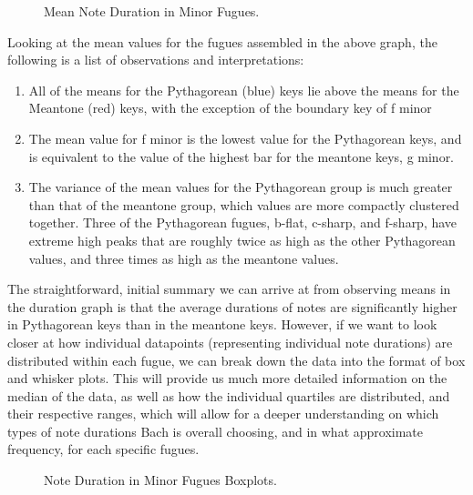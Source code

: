 \begin{figure}[H]
\vspace{1.5em}
    \centering
    \caption{Mean Note Duration in Minor Fugues.}
\end{figure}    Looking at the mean values for the fugues assembled in the above graph,
the following is a list of observations and interpretations:

\begin{enumerate}
\def\labelenumi{\arabic{enumi}.}
\tightlist
\item
  All of the means for the Pythagorean (blue) keys lie above the means
  for the Meantone (red) keys, with the exception of the boundary key of
  f minor
\item
  The mean value for f minor is the lowest value for the Pythagorean
  keys, and is equivalent to the value of the highest bar for the
  meantone keys, g minor.
\item
  The variance of the mean values for the Pythagorean group is much
  greater than that of the meantone group, which values are more
  compactly clustered together. Three of the Pythagorean fugues, b-flat,
  c-sharp, and f-sharp, have extreme high peaks that are roughly twice
  as high as the other Pythagorean values, and three times as high as
  the meantone values.
\end{enumerate}

The straightforward, initial summary we can arrive at from observing
means in the duration graph is that the average durations of notes are
significantly higher in Pythagorean keys than in the meantone keys.
However, if we want to look closer at how individual datapoints
(representing individual note durations) are distributed within each
fugue, we can break down the data into the format of box and whisker
plots. This will provide us much more detailed information on the median
of the data, as well as how the individual quartiles are distributed,
and their respective ranges, which will allow for a deeper understanding
on which types of note durations Bach is overall choosing, and in what
approximate frequency, for each specific fugues.



\begin{figure}[H]
\vspace{1.5em}
    \centering
    \caption{Note Duration in Minor Fugues Boxplots.}
\end{figure}

